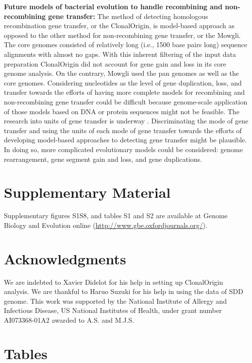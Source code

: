 \documentclass[english]{article}
\begin{document}
\textbf{Future models of bacterial evolution to handle recombining and
non-recombining gene transfer:}
The method of detecting homologous recombination gene transfer, or
the ClonalOrigin, is model-based approach as opposed to the other
method for non-recombining gene transfer, or the Mowgli.
The core genomes consisted of relatively long (i.e., 1500 base pairs
long) sequence alignments with almost no gaps. With this inherent
filtering of the input data preparation ClonalOrigin did not account
for gene gain and loss in its core genome analysis. On the contrary,
Mowgli used the pan genomes as well as the core genomes.  Considering
nucleotides as the level of gene duplication, loss, and transfer towards
the efforts of having more complete models for recombining and non-recombining
gene transfer
could be difficult because genome-scale application of those models
based on DNA or protein sequences might not be feasible.
The research into units
of gene transfer is underway \citep[e.g.,][]{Chan2009a}. Discriminating
the mode of gene transfer and using the units of each mode of gene
transfer towards the efforts of developing model-based approaches
to detecting gene transfer might be plausible. In doing so, more complicated
evolutionary models could be considered: genome rearrangement,
gene segment gain and loss, and gene duplications. 

\section*{Supplementary Material}

Supplementary figures S1\textendash{}S8, and tables S1 and S2
are available at Genome Biology
and Evolution online (\url{http://www.gbe.oxfordjournals.org/}).

\section*{Acknowledgments}

We are indebted to Xavier Didelot for his help in setting up ClonalOrigin
analysis.  We are thankful to Haruo Suzuki for his help
in using the data of SDD genome. This work was supported by the National
Institute of Allergy and Infectious Disease, US National Institutes
of Health, under grant number AI073368-01A2 awarded to A.S. and M.J.S.





\clearpage{}


\section*{Tables}
\end{document}
